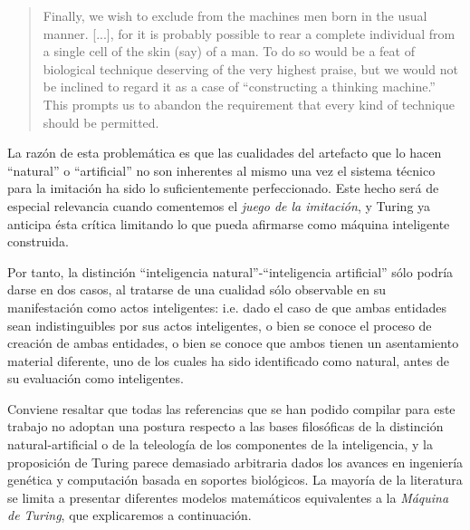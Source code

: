 \documentclass[12pt]{memoir}
\begin{document}
\begin{quotation}
Finally, we wish to exclude from the machines men born in the usual manner. [...], for it is probably possible to rear a complete individual from a single cell of the skin (say) of a man. To do so would be a feat of biological technique deserving of the very highest praise, but we would not be inclined to regard it as a case of ``constructing a thinking machine.'' This prompts us to abandon the requirement that every kind of technique should be permitted. \parencite[apartado 3]{Turing1950cmi}
\end{quotation}

La razón de esta problemática es que las cualidades del artefacto que lo hacen ``natural'' o ``artificial'' no son inherentes al mismo una vez el sistema técnico para la imitación ha sido lo suficientemente perfeccionado. Este hecho será de especial relevancia cuando comentemos el \textit{juego de la imitación}, y Turing ya anticipa ésta crítica limitando lo que pueda afirmarse como máquina inteligente construida.

Por tanto, la distinción ``inteligencia natural''-``inteligencia artificial'' sólo podría darse en dos casos, al tratarse de una cualidad sólo observable en su manifestación como actos inteligentes: i.e. dado el caso de que ambas entidades sean indistinguibles por sus actos inteligentes, o bien se conoce el proceso de creación de ambas entidades, o bien se conoce que ambos tienen un asentamiento material diferente, uno de los cuales ha sido identificado como natural, antes de su evaluación como inteligentes.

Conviene resaltar que todas las referencias que se han podido compilar para este trabajo no adoptan una postura respecto a las bases filosóficas de la distinción natural-artificial o de la teleología de los componentes de la inteligencia, y la proposición de Turing parece demasiado arbitraria dados los avances en ingeniería genética y computación basada en soportes biológicos. La mayoría de la literatura se limita a presentar diferentes modelos matemáticos equivalentes a la \textit{Máquina de Turing}, que explicaremos a continuación.
\end{document}
